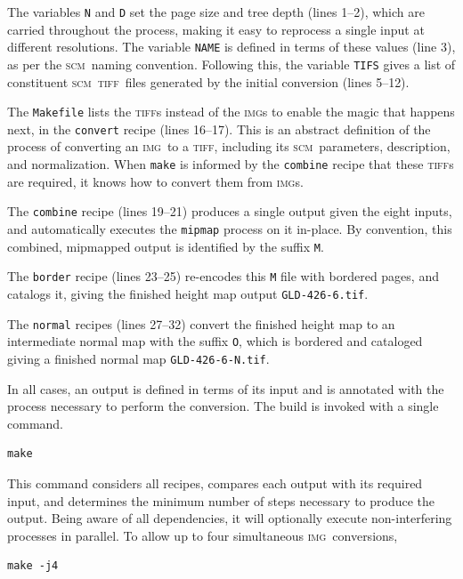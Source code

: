 \documentclass[oneside,10pt]{memoir}
\newcommand{\scm}     {\textsc{scm}}
\newcommand{\tiff}    {\textsc{tiff}}
\newcommand{\img}     {\textsc{img}}
\begin{document}
\begin{Spacing}{1.1}
The variables \texttt{N} and \texttt{D} set the page size and tree depth (lines 1--2), which are carried throughout the process, making it easy to reprocess a single input at different resolutions. The variable \texttt{NAME} is defined in terms of these values (line 3), as per the \scm\ naming convention. Following this, the variable \texttt{TIFS} gives a list of constituent \scm\ \tiff\ files generated by the initial conversion (lines 5--12).

The \texttt{Makefile} lists the \tiff s instead of the \img s to enable the magic that happens next, in the \texttt{convert} recipe (lines 16--17). This is an abstract definition of the process of converting an \img\ to a \tiff, including its \scm\ parameters, description, and normalization. When \texttt{make} is informed by the \texttt{combine} recipe that these \tiff s are required, it knows how to convert them from \img s.

The \texttt{combine} recipe (lines 19--21) produces a single output given the eight inputs, and automatically executes the \texttt{mipmap} process on it in-place. By convention, this combined, mipmapped output is identified by the suffix \texttt{M}.

The \texttt{border} recipe (lines 23--25) re-encodes this \texttt{M} file with bordered pages, and catalogs it, giving the finished height map output \texttt{GLD-426-6.tif}.

The \texttt{normal} recipes (lines 27--32) convert the finished height map to an intermediate normal map with the suffix \texttt{O}, which is bordered and cataloged giving a finished normal map \texttt{GLD-426-6-N.tif}.

In all cases, an output is defined in terms of its input and is annotated with the process necessary to perform the conversion. The build is invoked with a single command.

\begin{Verbatim}
make
\end{Verbatim}

This command considers all recipes, compares each output with its required input, and determines the minimum number of steps necessary to produce the output. Being aware of all dependencies, it will optionally execute non-interfering processes in parallel. To allow up to four simultaneous \img\ conversions,

\begin{Verbatim}
make -j4
\end{Verbatim}


\end{Spacing}
\end{document}
